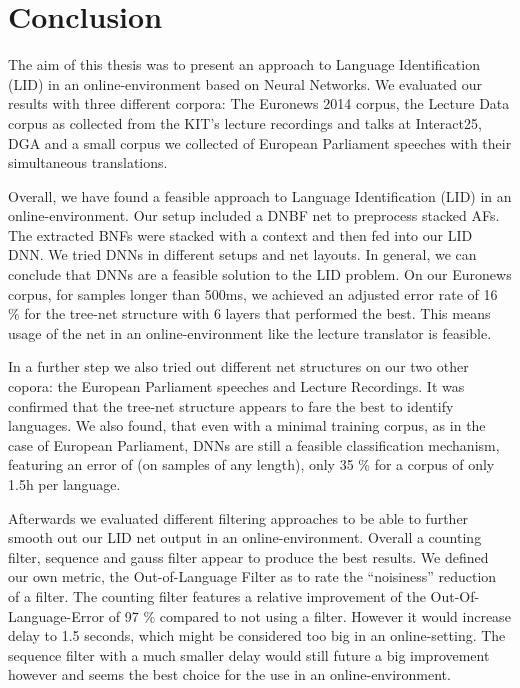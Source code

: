 
\chapter{Conclusion}
\label{ch:Conclusion}

The aim of this thesis was to present an approach to Language Identification (LID) in an online-environment based on Neural Networks. We evaluated our results with three different corpora: The Euronews 2014 corpus, the Lecture Data corpus as collected from the KIT's lecture recordings and talks at Interact25, DGA and a small corpus we collected of European Parliament speeches with their simultaneous translations.

Overall, we have found a feasible approach to Language Identification (LID) in an online-environment. Our setup included a DNBF net to preprocess stacked AFs. The extracted BNFs were stacked with a context and then fed into our LID DNN.  We tried DNNs in different setups and net layouts. In general, we can conclude that DNNs are a feasible solution to the LID problem. On our Euronews corpus, for samples longer than 500ms, we achieved an adjusted error rate of 16 \% for the tree-net structure with 6 layers that performed the best. This means usage of the net in an online-environment like the lecture translator is feasible.

In a further step we also tried out different net structures on our two other copora: the European Parliament speeches and Lecture Recordings. It was confirmed that the tree-net structure appears to fare the best to identify languages. We also found, that even with a minimal training corpus, as in the case of European Parliament, DNNs are still a feasible classification mechanism, featuring an error of (on samples of any length), only 35 \% for a corpus of only 1.5h per language. 

Afterwards we evaluated different filtering approaches to be able to further smooth out our LID net output in an online-environment. Overall a counting filter, sequence and gauss filter appear to produce the best results. We defined our own metric, the Out-of-Language Filter as to rate the ``noisiness'' reduction of a filter. The counting filter features a relative improvement of the Out-Of-Language-Error of 97 \% compared to not using a filter. However it would increase delay to 1.5 seconds, which might be considered too big in an online-setting. The sequence filter with a much smaller delay would still future a big improvement however and seems the best choice for the use in an online-environment.

